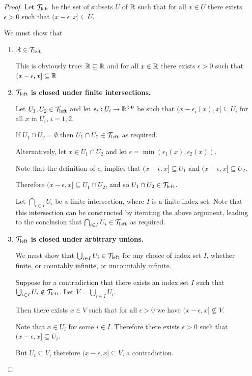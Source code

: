 \documentclass[12pt]{article}
\begin{document}
\begin{proof}
  Let $\mathcal T_\text{left}$ be the set of subsets $U$ of $\mathbb{R}$ such that for all $x \in U$ there exists
  $\epsilon > 0$ such that $(x - \epsilon, x] \subseteq U$.

  We must show that
  \begin{enumerate}
  \item {\bf $\mathbb{R} \in \mathcal T_\text{left}$}

    This is obviously true: $\mathbb{R} \subseteq \mathbb{R}$ and for all $x \in \mathbb{R}$ there exists $\epsilon > 0$
    such that $(x - \epsilon, x] \subseteq \mathbb{R}$



  \item {\bf $\mathcal T_\text{left}$ is closed under finite intersections.}

    Let $U_1, U_2 \in \mathcal T_\text{left}$ and let $\epsilon_i:U_i \to \mathbb{R}^{>0}$ be such that
    $(x - \epsilon_i(x), x] \subseteq U_i$ for all $x$ in $U_i$, $i = 1, 2$.

    If $U_1 \cap U_2 = \emptyset$ then $U_1 \cap U_2 \in \mathcal T_\text{left}$ as required.

    Alternatively, let $x \in U_1 \cap U_2$ and let
    $\epsilon = \min(\epsilon_1(x), \epsilon_2(x))$.

    Note that the definition of $\epsilon_i$ implies that $(x - \epsilon, x] \subseteq U_1$ and
    $(x - \epsilon, x] \subseteq U_2$.

    Therefore $(x - \epsilon, x] \subseteq U_1 \cap U_2$, and so $U_1 \cap U_2 \in \mathcal T_\text{left}$.

    Let $\bigcap_{i \in I} U_i$ be a finite intersection, where $I$ is a finite index set. Note
    that this intersection can be constructed by iterating the above argument, leading to the
    conclusion that $\bigcap_{i \in I} U_i \in \mathcal T_\text{left}$ as required.

  \item {\bf $\mathcal T_\text{left}$ is closed under arbitrary unions.}

    We must show that $\bigcup_{i \in I} U_i \in \mathcal T_\text{left}$ for any choice of index set $I$, whether
    finite, or countably infinite, or uncountably infinite.

    Suppose for a contradiction that there exists an index set $I$ such that
    $\bigcup_{i \in I} U_i \notin \mathcal T_\text{left}$. Let $V = \bigcup_{i \in I} U_i$.

    Then there exists $x \in V$ such that for all $\epsilon > 0$ we have
    $(x - \epsilon, x] \not\subseteq V$.

    Note that $x \in U_i$ for some $i \in I$. Therefore there exists $\epsilon > 0$ such that
    $(x - \epsilon, x] \subseteq U_i$.

    But $U_i \subseteq V$, therefore $(x - \epsilon, x] \subseteq V$, a contradiction.
  \end{enumerate}
\end{proof}
\end{document}
